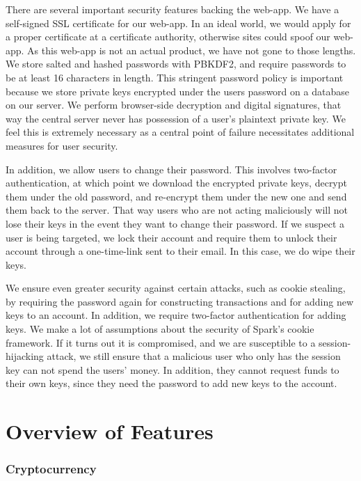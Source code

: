 \documentclass[12pt]{article}
\begin{document}
There are several important security features backing the web-app. We have a self-signed SSL certificate for our web-app. In an ideal world, we would apply for a proper certificate at a certificate authority, otherwise sites could spoof our web-app. As this web-app is not an actual product, we have not gone to those lengths. We store salted and hashed passwords with PBKDF2, and require passwords to be at least 16 characters in length. This stringent password policy is important because we store private keys encrypted under the users password on a database on our server. We perform browser-side decryption and digital signatures, that way the central server never has possession of a user's plaintext private key. We feel this is extremely necessary as a central point of failure necessitates additional measures for user security.

In addition, we allow users to change their password. This involves two-factor authentication, at which point we download the encrypted private keys, decrypt them under the old password, and re-encrypt them under the new one and send them back to the server. That way users who are not acting maliciously will not lose their keys in the event they want to change their password. If we suspect a user is being targeted, we lock their account and require them to unlock their account through a one-time-link sent to their email. In this case, we do wipe their keys.

We ensure even greater security against certain attacks, such as cookie stealing, by requiring the password again for constructing transactions and for adding new keys to an account. In addition, we require two-factor authentication for adding keys. We make a lot of assumptions about the security of Spark's cookie framework. If it turns out it is compromised, and we are susceptible to a session-hijacking attack, we still ensure that a malicious user who only has the session key can not spend the users' money. In addition, they cannot request funds to their own keys, since they need the password to add new keys to the account.

\section{Overview of Features}

\subsubsection*{Cryptocurrency}
\end{document}
